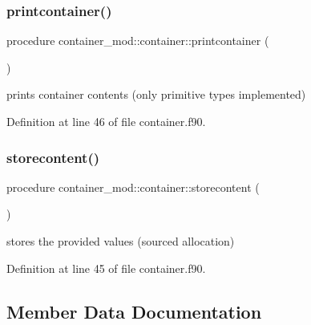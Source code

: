 \subsubsection{\texorpdfstring{printcontainer()}{printcontainer()}}
{\footnotesize\ttfamily procedure container\+\_\+mod\+::container\+::printcontainer (\begin{DoxyParamCaption}{ }\end{DoxyParamCaption})\hspace{0.3cm}{\ttfamily [private]}}



prints container contents (only primitive types implemented) 



Definition at line 46 of file container.\+f90.

\mbox{\label{structcontainer__mod_1_1container_a15e46e6f457bb49604ccf191780f6638}} 
\subsubsection{\texorpdfstring{storecontent()}{storecontent()}}
{\footnotesize\ttfamily procedure container\+\_\+mod\+::container\+::storecontent (\begin{DoxyParamCaption}{ }\end{DoxyParamCaption})\hspace{0.3cm}{\ttfamily [private]}}



stores the provided values (sourced allocation) 



Definition at line 45 of file container.\+f90.



\subsection{Member Data Documentation}
\mbox{\label{structcontainer__mod_1_1container_a297f4632156bf226aa8599a7f0cd55c0}} 
